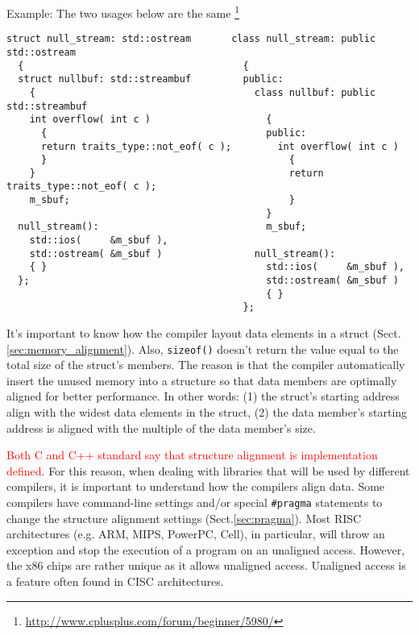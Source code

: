 Example: The two usages below
are the same \footnote{\url{http://www.cplusplus.com/forum/beginner/5980/}}
{\small
\begin{verbatim}
struct null_stream: std::ostream       class null_stream: public std::ostream
  {                                      {
  struct nullbuf: std::streambuf         public:
    {                                      class nullbuf: public std::streambuf
    int overflow( int c )                    {
      {                                      public:
      return traits_type::not_eof( c );        int overflow( int c )
      }                                          {
    }                                            return traits_type::not_eof( c );
    m_sbuf;                                      }
                                             }
  null_stream():                             m_sbuf;
    std::ios(     &m_sbuf ),
    std::ostream( &m_sbuf )                null_stream():
    { }                                      std::ios(     &m_sbuf ),
  };                                         std::ostream( &m_sbuf )
                                             { }
                                         };
\end{verbatim}
}
% 

It's important to know how the compiler layout data elements in a struct
(Sect.\ref{sec:memory_alignment}). Also, \verb!sizeof()! doesn't return the
value equal to the total size of the struct's members. The reason is that the
compiler automatically insert the unused memory into a structure so that data
members are optimally aligned for better performance. In other words: (1) the
struct's starting address align with the widest data elements in the struct, (2)
the data member's starting address is aligned with the multiple of the data
member's size. 

\textcolor{red}{Both C and C++ standard say that structure alignment is
implementation defined}. For this reason, when dealing with libraries that will
be used by different compilers, it is important to understand how the compilers
align data. Some compilers have command-line settings and/or special
\verb!#pragma! statements to change the structure alignment settings
(Sect.\ref{sec:pragma}). Most RISC architectures (e.g. ARM, MIPS, PowerPC,
Cell), in particular, will throw an exception and stop the execution of
a program on an unaligned access. However, the x86 chips are rather unique as it
allows unaligned access. Unaligned access is a feature often found in CISC architectures.

